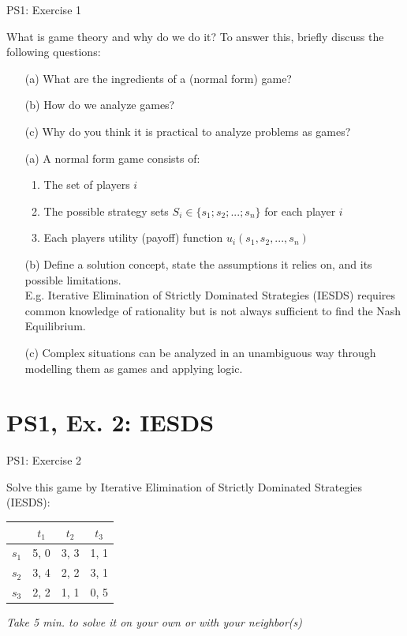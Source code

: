 \begin{frame}{PS1: Exercise 1}
\begin{multicols}{2}
What is game theory and why do we do it? To answer this, briefly discuss the following questions:
\begin{itemize}
  \item[(a)] What are the ingredients of a (normal form) game?
  \item[(b)] How do we analyze games?
  \item[(c)] Why do you think it is practical to analyze problems as games?
\end{itemize}
\vfill\null
\columnbreak
\begin{itemize}
  \item[(a)] A normal form game consists of:
    \begin{enumerate}
      \item The set of players $i$
      \item The possible strategy sets $S_i\in \{s_1;s_2;...;s_n\}$ for each player $i$
      \item Each players utility (payoff) function $u_i(s_1,s_2,...,s_n)$
    \end{enumerate}
  \item[(b)] Define a solution concept, state the assumptions it relies on, and its possible limitations.\\
  E.g. Iterative Elimination of Strictly Dominated Strategies (IESDS) requires common knowledge of rationality but is not always sufficient to find the Nash Equilibrium.
  \item[(c)] Complex situations can be analyzed in an unambiguous way through modelling them as games and applying logic.
\end{itemize}
\vfill\null
\end{multicols}
\end{frame}


\section{PS1, Ex. 2: IESDS}

\begin{frame}{PS1: Exercise 2}
\begin{multicols}{2}
Solve this game by Iterative Elimination of Strictly Dominated Strategies (IESDS):
\begin{table}
  \begin{tabular}{c|c|c|c}
          & $t_1$ & $t_2$ & $t_3$ \\
    \midrule
    $s_1$ & 5, 0  & 3, 3  & 1, 1 \\
    \midrule
    $s_2$ & 3, 4  & 2, 2  & 3, 1 \\
    \midrule
    $s_3$ & 2, 2  & 1, 1  & 0, 5
  \end{tabular}
\end{table}
\vfill\null
\columnbreak
\textit{Take 5 min. to solve it on your own or with your neighbor(s)}
\vfill\null
\end{multicols}
\end{frame}

